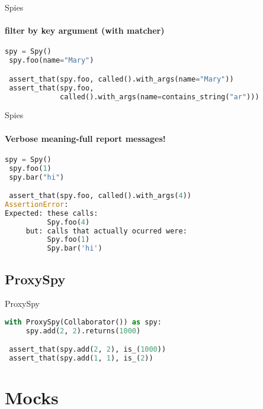 \documentclass[11pt]{beamer}
\begin{document}
\begin{frame}[fragile]{Spies}
\framesubtitle{filter by key argument (with matcher)}

\begin{exampleblock}{}
\begin{lstlisting}[language=Python]
 spy = Spy()
 spy.foo(name="Mary")

 assert_that(spy.foo, called().with_args(name="Mary"))
 assert_that(spy.foo,
             called().with_args(name=contains_string("ar")))
\end{lstlisting}
\end{exampleblock}

\end{frame}


\begin{frame}[fragile]{Spies}
\framesubtitle{Verbose meaning-full report messages!}

\begin{exampleblock}{}
\begin{lstlisting}[language=Python]
 spy = Spy()
 spy.foo(1)
 spy.bar("hi")

 assert_that(spy.foo, called().with_args(4))
AssertionError:
Expected: these calls:
          Spy.foo(4)
     but: calls that actually ocurred were:
          Spy.foo(1)
          Spy.bar('hi')
\end{lstlisting}
\end{exampleblock}

\end{frame}

\subsection{ProxySpy}

\begin{frame}[fragile]{ProxySpy}

\begin{exampleblock}{}
\begin{lstlisting}[language=Python]
 with ProxySpy(Collaborator()) as spy:
     spy.add(2, 2).returns(1000)

 assert_that(spy.add(2, 2), is_(1000))
 assert_that(spy.add(1, 1), is_(2))
\end{lstlisting}
\end{exampleblock}

\end{frame}


\section{Mocks}
\end{document}
